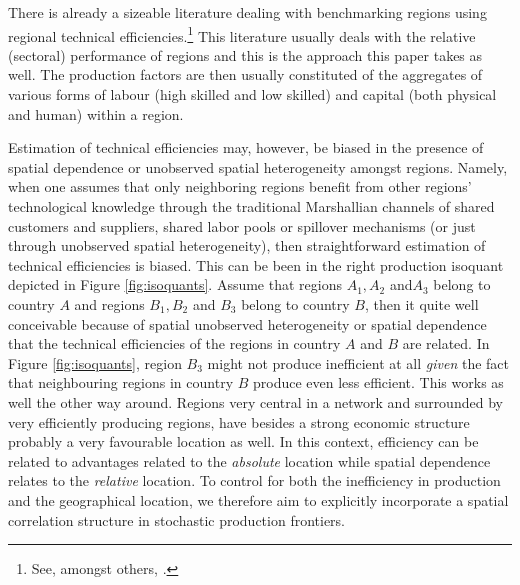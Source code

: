 \documentclass[11pt,parskip,abstracton,notitlepage]{scrartcl}
\begin{document}
There is already a sizeable literature dealing with benchmarking regions using regional technical efficiencies.\footnote{See, amongst others, \citet{BROCK1999, puig2001technical, puig2008some, ALVAREZ2007}.} This literature usually deals with the relative (sectoral) performance of regions and this is the approach this paper takes as well. The production factors are then usually constituted of the aggregates of various forms of labour (high skilled and low skilled) and capital (both physical and human) within a region. 

Estimation of technical efficiencies may, however, be biased in the presence of spatial dependence or unobserved spatial heterogeneity amongst regions. Namely, when one assumes that only neighboring regions benefit from other regions' technological knowledge through the traditional Marshallian channels of shared customers and suppliers, shared labor pools or spillover mechanisms (or just through unobserved spatial heterogeneity), then straightforward estimation of technical efficiencies is biased. This can be been in the right production isoquant depicted in Figure \ref{fig:isoquants}. Assume that regions $A_1, A_2$ and$A_3$ belong to country $A$ and regions $B_1, B_2$ and $B_3$ belong to country $B$, then it quite well conceivable because of spatial unobserved heterogeneity or spatial dependence that the technical efficiencies of the regions in country $A$ and $B$ are related. In Figure \ref{fig:isoquants}, region $B_3$ might not produce inefficient at all \emph{given} the fact that neighbouring regions in country $B$ produce even less efficient. This works as well the other way around. Regions very central in a network and surrounded by very efficiently producing regions, have besides a strong economic structure probably a very favourable location as well. In this context, efficiency can be related to advantages related to the \emph{absolute} location while spatial dependence relates to the \emph{relative} location. To control for both the inefficiency in production and the geographical location, we therefore aim to explicitly incorporate a spatial correlation structure in stochastic production frontiers. 
\end{document}
